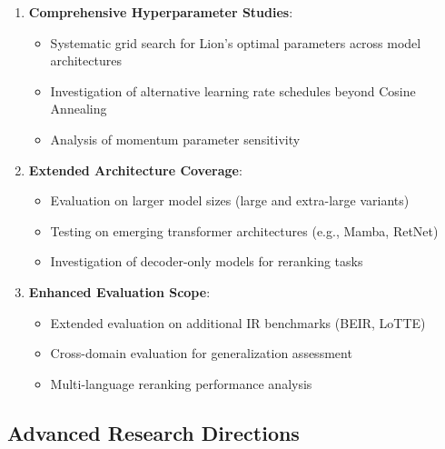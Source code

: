 \begin{enumerate}
    \item \textbf{Comprehensive Hyperparameter Studies}:
    \begin{itemize}
        \item Systematic grid search for Lion's optimal parameters across model architectures
        \item Investigation of alternative learning rate schedules beyond Cosine Annealing
        \item Analysis of momentum parameter sensitivity
    \end{itemize}

    \item \textbf{Extended Architecture Coverage}:
    \begin{itemize}
        \item Evaluation on larger model sizes (large and extra-large variants)
        \item Testing on emerging transformer architectures (e.g., Mamba, RetNet)
        \item Investigation of decoder-only models for reranking tasks
    \end{itemize}

    \item \textbf{Enhanced Evaluation Scope}:
    \begin{itemize}
        \item Extended evaluation on additional IR benchmarks (BEIR, LoTTE)
        \item Cross-domain evaluation for generalization assessment
        \item Multi-language reranking performance analysis
    \end{itemize}
\end{enumerate}

\subsection{Advanced Research Directions}

